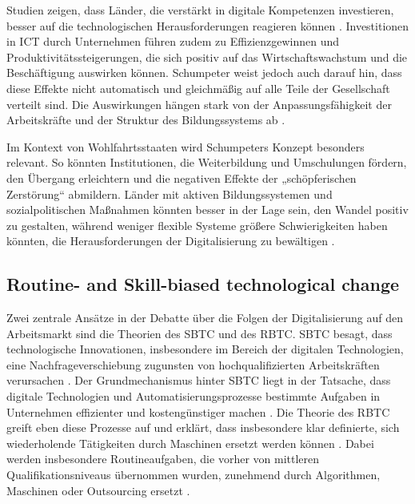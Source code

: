 Studien zeigen, dass Länder, die verstärkt in digitale Kompetenzen investieren, besser auf die 
technologischen Herausforderungen reagieren können \parencite[S. 15–17]{oecd2019measuring}. 
Investitionen in \ac{ICT} durch Unternehmen führen zudem zu Effizienzgewinnen und 
Produktivitätssteigerungen, die sich positiv auf das Wirtschaftswachstum und die Beschäftigung 
auswirken können. Schumpeter weist jedoch auch darauf hin, dass diese Effekte nicht automatisch 
und gleichmäßig auf alle Teile der Gesellschaft verteilt sind. Die Auswirkungen hängen stark von 
der Anpassungsfähigkeit der Arbeitskräfte und der Struktur des Bildungssystems ab 
\parencite[S. 48]{oecd2019measuring}.

Im Kontext von Wohlfahrtsstaaten wird Schumpeters Konzept besonders relevant. So könnten 
Institutionen, die Weiterbildung und Umschulungen fördern, den Übergang erleichtern und die 
negativen Effekte der „schöpferischen Zerstörung“ abmildern. Länder mit aktiven Bildungssystemen 
und sozialpolitischen Maßnahmen könnten besser in der Lage sein, den Wandel positiv zu gestalten, 
während weniger flexible Systeme größere Schwierigkeiten haben könnten, die Herausforderungen der 
Digitalisierung zu bewältigen \parencite[vgl.][S. 29–31]{espingandersen1990thethree}.


\subsection{Routine- and Skill-biased technological change}

Zwei zentrale Ansätze in der Debatte über die Folgen der Digitalisierung auf den Arbeitsmarkt sind 
die Theorien des \ac{SBTC} und des \ac{RBTC}. \ac{SBTC} besagt, dass technologische Innovationen, 
insbesondere im Bereich der digitalen Technologien, eine Nachfrageverschiebung zugunsten von 
hochqualifizierten Arbeitskräften verursachen \parencite[vgl.][S. 1]{violante2008skill}. Der 
Grundmechanismus hinter \ac{SBTC} liegt in der Tatsache, dass digitale Technologien und 
Automatisierungsprozesse bestimmte Aufgaben in Unternehmen effizienter und kostengünstiger machen 
\parencite[vgl.][S. 2–3]{violante2008skill}. Die Theorie des \ac{RBTC} greift eben diese Prozesse 
auf und erklärt, dass insbesondere klar definierte, sich wiederholende Tätigkeiten durch 
Maschinen ersetzt werden können \parencite[vgl.][S. 2509–2510]{goos2014explaining}. Dabei werden 
insbesondere Routineaufgaben, die vorher von mittleren Qualifikationsniveaus übernommen wurden, 
zunehmend durch Algorithmen, Maschinen oder Outsourcing ersetzt 
\parencite[vgl.][S. 1279]{autor2003theskill}.

